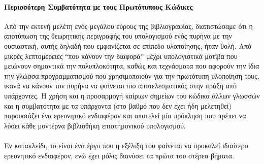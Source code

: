 \paragraph*{Περισσότερη Συμβατότητα με τους Πρωτότυπους Κώδικες}
Από την εκτενή μελέτη ενός μεγάλου εύρους της βιβλιογραφίας, διαπιστώσαμε ότι η αποτύπωση της θεωρητικής περιγραφής του υπολογισμού ενός πυρήνα με την ουσιαστική, αυτής δηλαδή που εμφανίζεται σε επίπεδο υλοποίησης, ήταν θολή.
Από μικρές λεπτομέρειες ``που κάνουν την διαφορά'' μέχρι υπολογιστικά μοτίβα που μειώνουν σημαντικά την πολυπλοκότητα, καθώς και τεχνάσματα που αφορούν την ίδια την γλώσσα προγραμματισμού που χρησιμοποιούν για την πρωτότυπη υλοποίηση τους, ικανά να κάνουν τον πυρήνα να φαίνεται πιο αποτελεσματικός στην πράξη από υπάρχοντες.
Η χρήση και η προσαρμογή καίριων σημείων του κώδικα άλλων γλωσσών και η συμβατότητα με τα υπάρχοντα (στο βαθμό που δεν έχει ήδη μελετηθεί) παρουσιάζει ένα ερευνητικό ενδιαφέρον και αποτελεί μία πρόκληση που πρέπει να λύσει κάθε μοντέρνα βιβλιοθήκη επιστημονικού υπολογισμού.\\
\paragraph*{}Εν κατακλείδι, το  είναι ένα έργο που η εξέλιξη του φαίνεται να προκαλεί ιδιαίτερο ερευνητικό ενδιαφέρον, ενώ έχει μόλις διανύσει τα πρώτα του στέρεα βήματα.
